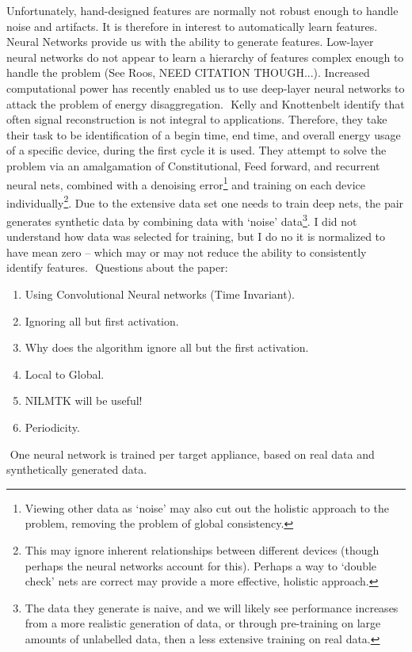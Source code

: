 \documentclass{article}
\begin{document}
Unfortunately, hand-designed features are normally not robust enough to handle noise and artifacts. It is therefore in interest to automatically learn features. Neural Networks provide us with the ability to generate features. Low-layer neural networks do not appear to learn a hierarchy of features complex enough to handle the problem (See Roos, NEED CITATION THOUGH...). Increased computational power has recently enabled us to use deep-layer neural networks to attack the problem of energy disaggregation.
​
Kelly and Knottenbelt identify that often signal reconstruction is not integral to applications. Therefore, they take their task to be identification of a begin time, end time, and overall energy usage of a specific device, during the first cycle it is used. They attempt to solve the problem via an amalgamation of Constitutional, Feed forward, and recurrent neural nets, combined with a denoising error\footnote{Viewing other data as `noise' may also cut out the holistic approach to the problem, removing the problem of global consistency.} and training on each device individually\footnote{This may ignore inherent relationships between different devices (though perhaps the neural networks account for this). Perhaps a way to `double check' nets are correct may provide a more effective, holistic approach.}. Due to the extensive data set one needs to train deep nets, the pair generates synthetic data by combining data with `noise' data\footnote{The data they generate is naive, and we will likely see performance increases from a more realistic generation of data, or through pre-training on large amounts of unlabelled data, then a less extensive training on real data.}. I did not understand how data was selected for training, but I do no it is normalized to have mean zero -- which may or may not reduce the ability to consistently identify features.
​
Questions about the paper:
%
\begin{enumerate}
	\item Using Convolutional Neural networks (Time Invariant).
	\item Ignoring all but first activation.
	\item Why does the algorithm ignore all but the first activation.
	\item Local to Global.
	\item NILMTK will be useful!
	\item Periodicity.
\end{enumerate}
​
One neural network is trained per target appliance, based on real data and synthetically generated data.
\end{document}
